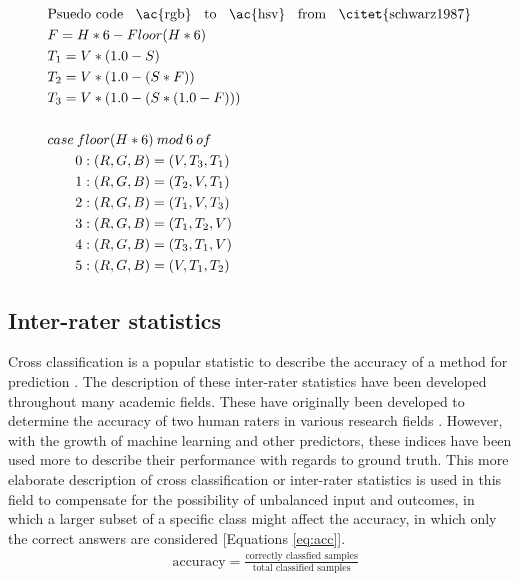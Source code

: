 \begin{equation}
	\begin{split}
		&\text{Psuedo code \: \ac{rgb} \: to \: \ac{hsv} \: from \: \citet{schwarz1987}}
		\\
		&F = H * 6 - Floor(H*6) \\
		&T_1 = V * (1.0 - S) \\
		&T_2 = V * (1.0 - (S * F)) \\
		&T_3 = V * (1.0 - (S * (1.0 - F))) \\
		\\
		&case\: floor(H*6)\: mod\: 6\: of\\
		&\qquad 0: (R,G,B) = (V, T_3, T_1)\\
		&\qquad 1: (R,G,B) = (T_2, V, T_1)\\
		&\qquad 2: (R,G,B) = (T_1, V, T_3)\\
		&\qquad 3: (R,G,B) = (T_1, T_2, V)\\
		&\qquad 4: (R,G,B) = (T_3, T_1, V)\\
		&\qquad 5: (R,G,B) = (V, T_1, T_2)\\
	\end{split}
\label{code:colour}
\end{equation}

\subsection{Inter-rater statistics} \label{sec:interrater}

Cross classification is a popular statistic to describe the accuracy of a method for prediction \citep{Warrens2011}. The description of these inter-rater statistics have been developed throughout many academic fields. These have originally been developed to determine the accuracy of two human raters in various research fields \citep{Bhowmick2008}. However, with the growth of machine learning and other predictors, these indices have been used more to describe their performance with regards to ground truth. This more elaborate description of cross classification or inter-rater statistics is used in this field to compensate for the possibility of unbalanced input and outcomes, in which a larger subset of a specific class might affect the accuracy, in which only the correct answers are considered [Equations \ref{eq:acc}]. \\

\begin{equation}
\begin{split}
&\text{accuracy} = \frac{\text{correctly classfied samples}}{\text{total classified samples}} \\
\end{split}
\label{eq:acc}
\end{equation}

